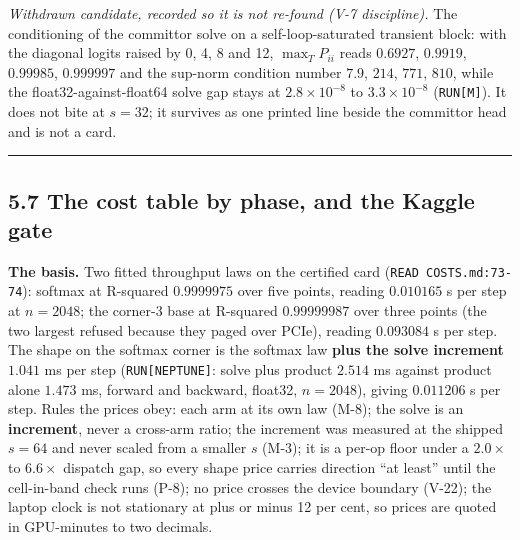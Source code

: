 \documentclass[11pt,a4paper]{article}
\theoremstyle{plain}
\theoremstyle{definition}
\theoremstyle{remark}
\begin{document}
\emph{Withdrawn candidate, recorded so it is not re-found (V-7
discipline).} The conditioning of the committor solve on a
self-loop-saturated transient block: with the diagonal logits raised by
0, 4, 8 and 12, \(\max_T P_{ii}\) reads \(0.6927\), \(0.9919\),
\(0.99985\), \(0.999997\) and the sup-norm condition number \(7.9\),
\(214\), \(771\), \(810\), while the float32-against-float64 solve gap
stays at \(2.8\times10^{-8}\) to \(3.3\times10^{-8}\)
(\texttt{RUN{[}M{]}}). It does not bite at \(s=32\); it survives as one
printed line beside the committor head and is not a card.

\begin{center}\rule{0.5\linewidth}{0.5pt}\end{center}

\subsection{5.7 The cost table by phase, and the Kaggle
gate}\label{the-cost-table-by-phase-and-the-kaggle-gate}

\textbf{The basis.} Two fitted throughput laws on the certified card
(\texttt{READ\ COSTS.md:73-74}): softmax at R-squared \(0.9999975\) over
five points, reading \(0.010165\) s per step at \(n=2048\); the corner-3
base at R-squared \(0.99999987\) over three points (the two largest
refused because they paged over PCIe), reading \(0.093084\) s per step.
The shape on the softmax corner is the softmax law \textbf{plus the
solve increment} \(1.041\) ms per step (\texttt{RUN{[}NEPTUNE{]}}: solve
plus product \(2.514\) ms against product alone \(1.473\) ms, forward
and backward, float32, \(n=2048\)), giving \(0.011206\) s per step.
Rules the prices obey: each arm at its own law (M-8); the solve is an
\textbf{increment}, never a cross-arm ratio; the increment was measured
at the shipped \(s=64\) and never scaled from a smaller \(s\) (M-3); it
is a per-op floor under a \(2.0\times\) to \(6.6\times\) dispatch gap,
so every shape price carries direction ``at least'' until the
cell-in-band check runs (P-8); no price crosses the device boundary
(V-22); the laptop clock is not stationary at plus or minus 12 per cent,
so prices are quoted in GPU-minutes to two decimals.
\end{document}
